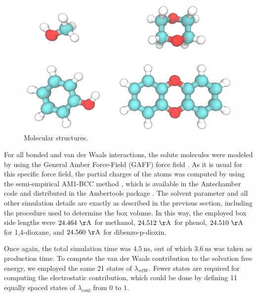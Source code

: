 \documentclass[
aip,
jcp,
reprint,
]{revtex4-1}
\begin{document}
\begin{figure}
	\centering
	\includegraphics[width=\linewidth]{molecular_structures}
	\caption{Molecular structures.}
	\label{fig:molecular structures}
\end{figure}

For all bonded and van der Waals interactions, the solute molecules were modeled by using the General Amber Force-Field (GAFF) force field \cite{Wang_2004}.
As it is usual for this specific force field, the partial charges of the atoms was computed by using the semi-empirical AM1-BCC method \cite{Jakalian_2000, *Jakalian_2002}, which is available in the Antechamber code \cite{Wang_2006} and distributed in the Ambertools package \cite{Case_2017}.
The solvent parameter and all other simulation details are exactly as described in the previous section, including the procedure used to determine the box volume.
In this way, the employed box side lengths were $24.464~\mathrm{\AA}$ for methanol, $24.512~\mathrm{\AA}$ for phenol, $24.510~\mathrm{\AA}$ for 1,4-dioxane, and $24.560~\mathrm{\AA}$ for dibenzo-p-dioxin.

Once again, the total simulation time was $4.5~\mathrm{ns}$, out of which $3.6~\mathrm{ns}$ was taken as production time.
To compute the van der Waals contribution to the solvation free energy, we employed the same 21 states of $\lambda_\mathrm{vdW}$.
Fewer states are required for computing the electrostatic contribution, which could be done by defining 11 equally spaced states of $\lambda_\mathrm{coul}$ from $0$ to $1$.
\end{document}
